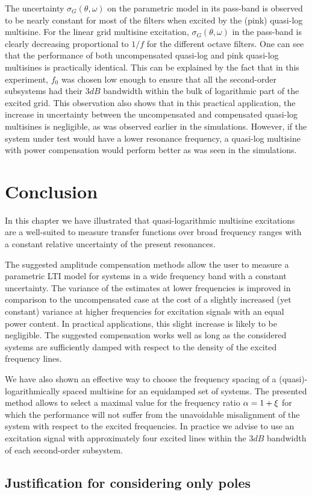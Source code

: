     The uncertainty $\sigma_G\left(\theta,\omega\right)$ on the parametric model in its pass-band is observed to be nearly constant for most of the filters when excited by the (pink) quasi-log multisine.
    For the linear grid multisine excitation, $\sigma_G\left(\theta,\omega\right)$ in the pass-band is clearly decreasing proportional to $1 / f$ for the different octave filters.
    One can see that the performance of both uncompensated quasi-log and pink quasi-log multisines is practically identical.
    This can be explained by the fact that in this experiment, $f_0$ was chosen low enough to ensure that all the second-order subsystems had their $3\unit{dB}$ bandwidth within the bulk of logarithmic part of the excited grid.
    This observation also shows that in this practical application, the increase in uncertainty between the uncompensated and compensated quasi-log multisines is negligible, as was observed earlier in the simulations.
    However, if the system under test would have a lower resonance frequency, a quasi-log multisine with power compensation would perform better as was seen in the simulations.

\section{Conclusion}
\label{sec:excitation:conclusion}
In this chapter we have illustrated that quasi-logarithmic multisine excitations are a well-suited to measure transfer functions over broad frequency ranges with a constant relative uncertainty of the present resonances.

The suggested amplitude compensation methods allow the user to measure a parametric LTI model for systems in a wide frequency band with a constant uncertainty.
The variance of the estimates at lower frequencies is improved in comparison to the uncompensated case at the cost of a slightly increased (yet constant) variance at higher frequencies for excitation signals with an equal power content.
In practical applications, this slight increase is likely to be negligible.
The suggested compensation works well as long as the considered systems are sufficiently damped with respect to the density of the excited frequency lines.

We have also shown an effective way to choose the frequency spacing of a (quasi)-logarithmically spaced multisine for an equidamped set of systems.
The presented method allows to select a maximal value for the frequency ratio $\alpha = 1 + \xi$ for which the performance will not suffer from the unavoidable misalignment of the system with respect to the excited frequencies.
In practice we advise to use an excitation signal with approximately four excited lines within the $3\unit{dB}$ bandwidth of each second-order subsystem.



\begin{subappendices}
  \section{Justification for considering only poles}

\end{subappendices}



